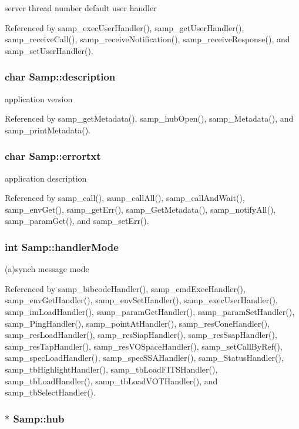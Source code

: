 server thread number default user handler 

Referenced by samp\_\-execUserHandler(), samp\_\-getUserHandler(), samp\_\-receiveCall(), samp\_\-receiveNotification(), samp\_\-receiveResponse(), and samp\_\-setUserHandler().\hypertarget{structSamp_d672d7d425e8180b93c7ca2229d1acd8}{
\subsubsection[{description}]{\setlength{\rightskip}{0pt plus 5cm}char {\bf Samp::description}}}
\label{structSamp_d672d7d425e8180b93c7ca2229d1acd8}


application version 

Referenced by samp\_\-getMetadata(), samp\_\-hubOpen(), samp\_\-Metadata(), and samp\_\-printMetadata().\hypertarget{structSamp_62629ad2155a2a1a7676e32ef9fb9ffd}{
\subsubsection[{errortxt}]{\setlength{\rightskip}{0pt plus 5cm}char {\bf Samp::errortxt}}}
\label{structSamp_62629ad2155a2a1a7676e32ef9fb9ffd}


application description 

Referenced by samp\_\-call(), samp\_\-callAll(), samp\_\-callAndWait(), samp\_\-envGet(), samp\_\-getErr(), samp\_\-GetMetadata(), samp\_\-notifyAll(), samp\_\-paramGet(), and samp\_\-setErr().\hypertarget{structSamp_14f6ed59a947504d37bd8cdd1f2f8e8d}{
\subsubsection[{handlerMode}]{\setlength{\rightskip}{0pt plus 5cm}int {\bf Samp::handlerMode}}}
\label{structSamp_14f6ed59a947504d37bd8cdd1f2f8e8d}


(a)synch message mode 

Referenced by samp\_\-bibcodeHandler(), samp\_\-cmdExecHandler(), samp\_\-envGetHandler(), samp\_\-envSetHandler(), samp\_\-execUserHandler(), samp\_\-imLoadHandler(), samp\_\-paramGetHandler(), samp\_\-paramSetHandler(), samp\_\-PingHandler(), samp\_\-pointAtHandler(), samp\_\-resConeHandler(), samp\_\-resLoadHandler(), samp\_\-resSiapHandler(), samp\_\-resSsapHandler(), samp\_\-resTapHandler(), samp\_\-resVOSpaceHandler(), samp\_\-setCallByRef(), samp\_\-specLoadHandler(), samp\_\-specSSAHandler(), samp\_\-StatusHandler(), samp\_\-tbHighlightHandler(), samp\_\-tbLoadFITSHandler(), samp\_\-tbLoadHandler(), samp\_\-tbLoadVOTHandler(), and samp\_\-tbSelectHandler().\hypertarget{structSamp_14811ec2253a6e2e75a8ec863c4150b0}{
\subsubsection[{hub}]{ $\ast$ {\bf Samp::hub}}}
\label{structSamp_14811ec2253a6e2e75a8ec863c4150b0}


